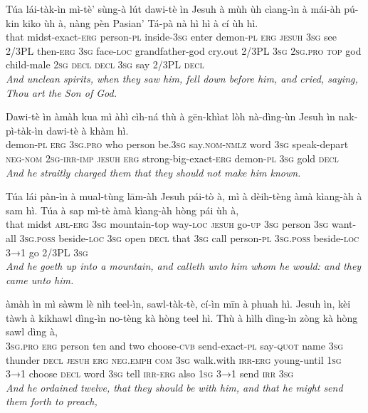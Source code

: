 \documentclass[11pt,a4paper]{article}
\begin{document}
\begin{exe}
\gll Túa lái-tàk-ìn mì-tè' sùng-à lút dawi-tè ìn Jesuh à mùh ùh cìang-ìn à mái-àh pú-kin kiko ùh à, nàng pèn Pasian' Tá-pà nà hì hì à cí ùh hì. \\
     that midst-exact-\textsc{erg} person-\textsc{pl} inside-\textsc{3sg} enter demon-\textsc{pl} \textsc{erg} \textsc{jesuh} \textsc{3sg} see 2/3PL then-\textsc{erg} \textsc{3sg} face-\textsc{loc} grandfather-god cry.out 2/3PL \textsc{3sg} \textsc{2sg}.\textsc{pro} \textsc{top} god child-male \textsc{2sg} \textsc{decl} \textsc{decl} \textsc{3sg} say 2/3PL \textsc{decl} \\
\glt \textcolor{kjvcolor}{\textit{And unclean spirits, when they saw him, fell down before him, and cried, saying, Thou art the Son of God.}}

\gll Dawi-tè ìn àmàh kua mì àhì cìh-ná thù à gēn-khìat lòh nà-dìng-ùn Jesuh ìn nak-pì-tàk-ìn dawi-tè à khàm hì. \\
     demon-\textsc{pl} \textsc{erg} \textsc{3sg}.\textsc{pro} who person be.\textsc{3sg} say.\textsc{nom}-\textsc{nmlz} word \textsc{3sg} speak-depart \textsc{neg}-\textsc{nom} \textsc{2sg}-\textsc{irr}-\textsc{imp} \textsc{jesuh} \textsc{erg} strong-big-exact-\textsc{erg} demon-\textsc{pl} \textsc{3sg} gold \textsc{decl} \\
\glt \textcolor{kjvcolor}{\textit{And he straitly charged them that they should not make him known.}}

\gll Túa lái pàn-ìn à mual-tùng lām-àh Jesuh pái-tò à, mì à dèih-tèng àmà kìang-àh à sam hì. Túa à sap mì-tè àmà kìang-àh hòng pái ùh à, \\
     that midst \textsc{abl}-\textsc{erg} \textsc{3sg} mountain-top way-\textsc{loc} \textsc{jesuh} go-\textsc{up} \textsc{3sg} person \textsc{3sg} want-all \textsc{3sg}.\textsc{poss} beside-\textsc{loc} \textsc{3sg} open \textsc{decl} that \textsc{3sg} call person-\textsc{pl} \textsc{3sg}.\textsc{poss} beside-\textsc{loc} \textsc{3→1} go 2/3PL \textsc{3sg} \\
\glt \textcolor{kjvcolor}{\textit{And he goeth up into a mountain, and calleth unto him whom he would: and they came unto him.}}

\gll àmàh ìn mì sàwm lè nìh teel-ìn, sawl-tàk-tè, cí-ìn mīn à phuah hì. Jesuh ìn, kèi tàwh à kikhawl dìng-ìn no-tèng kà hòng teel hì. Thù à hìlh dìng-ìn zòng kà hòng sawl dìng à, \\
     \textsc{3sg}.\textsc{pro} \textsc{erg} person ten and two choose-\textsc{cvb} send-exact-\textsc{pl} say-\textsc{quot} name \textsc{3sg} thunder \textsc{decl} \textsc{jesuh} \textsc{erg} \textsc{neg}.\textsc{emph} \textsc{com} \textsc{3sg} walk.with \textsc{irr}-\textsc{erg} young-until \textsc{1sg} \textsc{3→1} choose \textsc{decl} word \textsc{3sg} tell \textsc{irr}-\textsc{erg} also \textsc{1sg} \textsc{3→1} send \textsc{irr} \textsc{3sg} \\
\glt \textcolor{kjvcolor}{\textit{And he ordained twelve, that they should be with him, and that he might send them forth to preach,}}


\end{exe}
\end{document}

